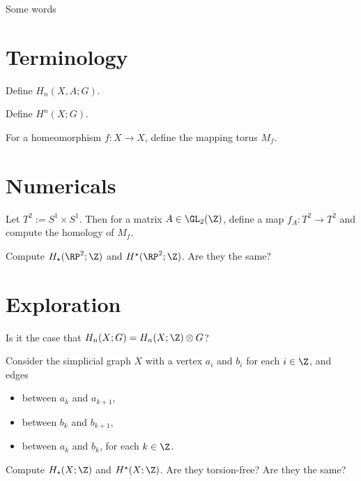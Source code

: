 \documentclass{homework}
\author{Jim Fowler}
\begin{document}
\maketitle

\begin{inspiration}
  Some words
\end{inspiration}

\section{Terminology}

\begin{problem}
  Define $H_n(X,A;G)$.
\end{problem}

\begin{problem}
 Define  
  $H^n(X;G)$.
\end{problem}

\begin{problem}
  For a homeomorphism $f : X \to X$, define the mapping torus $M_f$.
\end{problem}

\section{Numericals}

\begin{problem} Let $T^2 := S^1 \times S^1$.  Then for a matrix $A \in
\GL_2(\Z)$, define a map $f_A : T^2 \to T^2$ and compute the homology
of $M_f$.
\end{problem}

\begin{problem}
  Compute $H_\star(\RP^2;\Z)$ and $H^\star(\RP^2;\Z)$.  Are they the same?
\end{problem}

\section{Exploration}

\begin{problem}
  Is it the case that $H_n(X;G) = H_n(X;\Z) \otimes G$?
\end{problem}

\begin{problem}
  Consider the simplicial graph $X$ with a vertex $a_i$ and $b_i$ for each $i \in \Z$, and edges
  \begin{itemize}
  \item between $a_k$ and $a_{k+1}$,
  \item between $b_k$ and $b_{k+1}$,
  \item between $a_k$ and $b_k$, for each $k \in \Z$.
  \end{itemize} Compute $H_\star(X;\Z)$ and $H^\star(X;\Z)$.  Are they
torsion-free?  Are they the same?
\end{problem}
\end{document}
